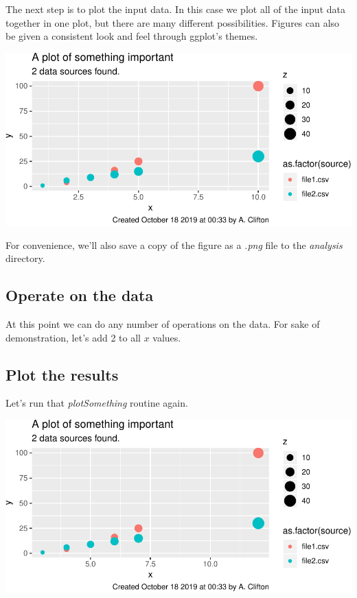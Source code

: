 \documentclass[11pt,]{article}
\newenvironment{Shaded}{\begin{snugshade}}{\end{snugshade}}
\newcommand{\FloatTok}[1]{\textcolor[rgb]{0.00,0.00,0.81}{#1}}
\newcommand{\NormalTok}[1]{#1}
\newcommand{\OperatorTok}[1]{\textcolor[rgb]{0.81,0.36,0.00}{\textbf{#1}}}
\newcommand{\StringTok}[1]{\textcolor[rgb]{0.31,0.60,0.02}{#1}}
\begin{document}
The next step is to plot the input data. In this case we plot all of the input data together in one plot, but there are many different possibilities. Figures can also be given a consistent look and feel through ggplot's themes.

\includegraphics{main_files/figure-latex/plot input data-1.pdf}

For convenience, we'll also save a copy of the figure as a \emph{.png} file to the \emph{analysis} directory.

\hypertarget{operate-on-the-data}{%
\subsection{Operate on the data}\label{operate-on-the-data}}

At this point we can do any number of operations on the data. For sake of demonstration, let's add 2 to all \(x\) values.

\begin{Shaded}
\end{Shaded}

\hypertarget{plot-the-results}{%
\subsection{Plot the results}\label{plot-the-results}}

Let's run that \emph{plotSomething} routine again.

\includegraphics{main_files/figure-latex/plot modified data-1.pdf}
\end{document}
